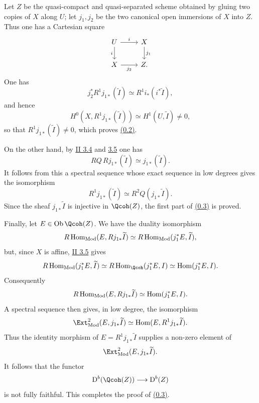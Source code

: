 Let $Z$ be the quasi-compact and quasi-separated scheme obtained by gluing two copies of $X$ along $U$; let $j_1,j_2$ be the two canonical open immersions of $X$ into $Z$. Thus one has a Cartesian square
\[
\begin{tikzcd}
 U \arrow[r,"i"] \arrow[d,"i"'] & X \arrow[d,"j_1"]\\
 X \arrow[r,"j_2"'] & Z .
\end{tikzcd}
\]
One has
\[
 j_2^*R^1j_{1*}(\widetilde I)\simeq R^1i_*(i^*\widetilde I),
\]
and hence
\[
 H^0(X,R^1j_{1*}(\widetilde I))\simeq H^1(U,\widetilde I)\ne0,
\]
so that $R^1j_{1*}(\widetilde I)\ne0$, which proves \hyperlink{sga6.e02.para.0-2}{(0.2)}.

On the other hand, by \hyperlink{sga6.e02.lem.3-4}{II 3.4} and \hyperlink{sga6.e02.prop.3-5}{3.5} one has
\[
 RQ\,Rj_{1*}(\widetilde I)\simeq j_{1*}(\widetilde I).
\]
It follows from this a spectral sequence whose exact sequence in low degrees gives the isomorphism
\[
 R^1j_{1*}(\widetilde I)\simeq R^2Q(j_{1*}\widetilde I).
\]
Since the sheaf $j_{1*}\widetilde I$ is injective in $\Qcoh(Z)$, the first part of \hyperlink{sga6.e02.para.0-3}{(0.3)} is proved.

Finally, let $E\in\Ob\Qcoh(Z)$. We have the duality isomorphism
\[
 R\Hom_{\Mod}(E,Rj_{1*}\widetilde I)
 \simeq R\Hom_{\Mod}(j_1^*E,\widetilde I),
\]
but, since $X$ is affine, \hyperlink{sga6.e02.prop.3-5}{II 3.5} gives
\[
 R\Hom_{\Mod}(j_1^*E,\widetilde I)
 \simeq R\Hom_{\Qcoh}(j_1^*E,I)
 \simeq \Hom(j_1^*E,I).
\]
Consequently
\[
 R\Hom_{\Mod}(E,Rj_{1*}\widetilde I)
 \simeq \Hom(j_1^*E,I).
\]
A spectral sequence then gives, in low degree, the isomorphism
\[
 \Ext^2_{\Mod}(E,j_{1*}\widetilde I)
 \simeq \Hom(E,R^1j_{1*}\widetilde I).
\]
Thus the identity morphism of $E=R^1j_{1*}\widetilde I$ supplies a non-zero element of
\[
 \Ext^2_{\Mod}(E,j_{1*}\widetilde I).
\]
It follows that the functor
\[
 \mathrm D^b(\Qcoh(Z))\longrightarrow \mathrm D^b(Z)
\]
is not fully faithful. This completes the proof of \hyperlink{sga6.e02.para.0-3}{(0.3)}.




\providecommand{\Diff}{\operatorname{Diff}}
\providecommand{\Hom}{\operatorname{Hom}}
\providecommand{\im}{\operatorname{Im}}
\providecommand{\ind}{\operatorname{ind}}
\providecommand{\Cone}{\operatorname{Cone}}
\providecommand{\Loclib}{\operatorname{Loclib}}
\providecommand{\ob}{\operatorname{ob}}
\providecommand{\Parf}{\operatorname{Parf}}
\providecommand{\Mod}{\operatorname{Mod}}
\providecommand{\Ob}{\operatorname{Ob}}
\providecommand{\Coker}{\operatorname{Coker}}
\providecommand{\Ker}{\operatorname{Ker}}
\providecommand{\cH}{\mathcal H}
\providecommand{\cO}{\mathcal O}
\providecommand{\cP}{\mathcal P}
\providecommand{\cE}{\mathcal E}
\providecommand{\cF}{\mathcal F}
\providecommand{\cG}{\mathcal G}
\providecommand{\cD}{\mathcal D}
\providecommand{\cT}{\mathcal T}
\providecommand{\cL}{\mathcal L}
\providecommand{\RHom}{\mathrm R\!\operatorname{Hom}}
\providecommand{\RGamma}{\mathrm R\Gamma}
\providecommand{\dlim}{\operatorname*{lim}}
\providecommand{\plim}{\operatorname*{lim}}


